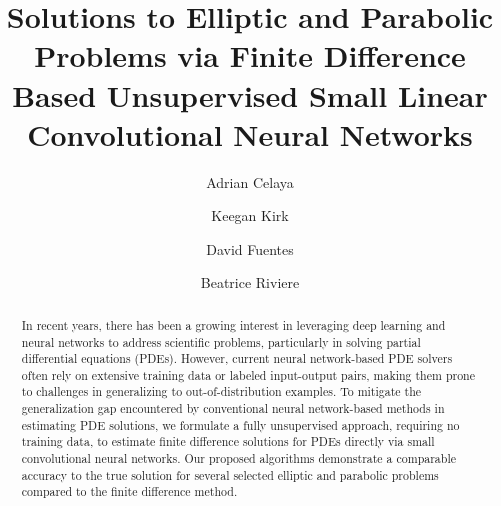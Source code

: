 \documentclass[preprint,12pt]{elsarticle}
\begin{document}
\begin{frontmatter}



\title{Solutions to Elliptic and Parabolic Problems via Finite Difference Based Unsupervised Small Linear Convolutional Neural Networks}



            
\author[rice,mda]{Adrian Celaya}
\author[rice]{Keegan Kirk}
\author[mda]{David Fuentes}
\author[rice]{Beatrice Riviere}


\begin{abstract}
In recent years, there has been a growing interest in leveraging deep learning and neural networks to address scientific problems, particularly in solving partial differential equations (PDEs).
However, current neural network-based PDE solvers often rely on extensive training data or labeled input-output pairs, making them prone to challenges in generalizing to out-of-distribution examples. To mitigate the generalization gap encountered by conventional neural network-based methods in estimating PDE solutions, we formulate a fully unsupervised approach, requiring no training data, to estimate finite difference solutions for PDEs directly via small convolutional neural networks. Our proposed algorithms demonstrate a comparable accuracy to the true solution for several selected elliptic and parabolic problems compared to the finite difference method.
\end{abstract}


\end{frontmatter}
\end{document}
